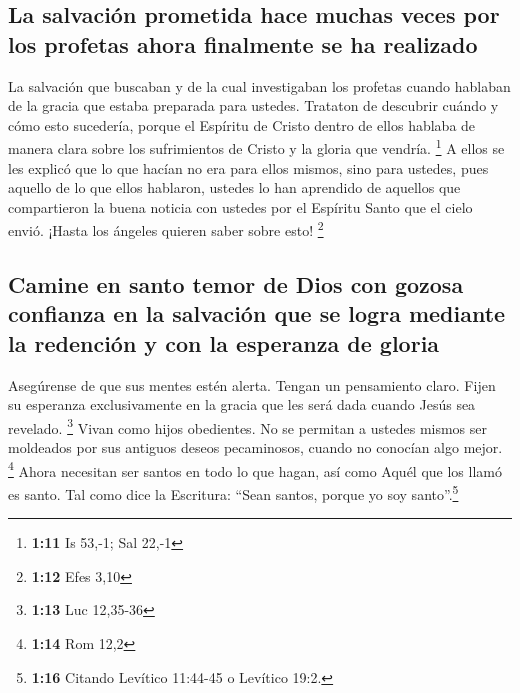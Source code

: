 \hypertarget{la-salvaciuxf3n-prometida-hace-muchas-veces-por-los-profetas-ahora-finalmente-se-ha-realizado}{%
\subsection{La salvación prometida hace muchas veces por los profetas
ahora finalmente se ha
realizado}\label{la-salvaciuxf3n-prometida-hace-muchas-veces-por-los-profetas-ahora-finalmente-se-ha-realizado}}

 La salvación que buscaban y de la cual investigaban los
profetas cuando hablaban de la gracia que estaba preparada para ustedes.
 Trataton de descubrir cuándo y cómo esto sucedería,
porque el Espíritu de Cristo dentro de ellos hablaba de manera clara
sobre los sufrimientos de Cristo y la gloria que vendría. \footnote{\textbf{1:11}
  Is 53,-1; Sal 22,-1}  A ellos se les explicó que lo que
hacían no era para ellos mismos, sino para ustedes, pues aquello de lo
que ellos hablaron, ustedes lo han aprendido de aquellos que
compartieron la buena noticia con ustedes por el Espíritu Santo que el
cielo envió. ¡Hasta los ángeles quieren saber sobre esto! \footnote{\textbf{1:12}
  Efes 3,10}

\hypertarget{camine-en-santo-temor-de-dios-con-gozosa-confianza-en-la-salvaciuxf3n-que-se-logra-mediante-la-redenciuxf3n-y-con-la-esperanza-de-gloria}{%
\subsection{Camine en santo temor de Dios con gozosa confianza en la
salvación que se logra mediante la redención y con la esperanza de
gloria}\label{camine-en-santo-temor-de-dios-con-gozosa-confianza-en-la-salvaciuxf3n-que-se-logra-mediante-la-redenciuxf3n-y-con-la-esperanza-de-gloria}}

 Asegúrense de que sus mentes estén alerta. Tengan un
pensamiento claro. Fijen su esperanza exclusivamente en la gracia que
les será dada cuando Jesús sea revelado. \footnote{\textbf{1:13} Luc
  12,35-36}  Vivan como hijos obedientes. No se permitan
a ustedes mismos ser moldeados por sus antiguos deseos pecaminosos,
cuando no conocían algo mejor. \footnote{\textbf{1:14} Rom 12,2}
 Ahora necesitan ser santos en todo lo que hagan, así
como Aquél que los llamó es santo.  Tal como dice la
Escritura: ``Sean santos, porque yo soy santo''.\footnote{\textbf{1:16}
  Citando Levítico 11:44-45 o Levítico 19:2.}

